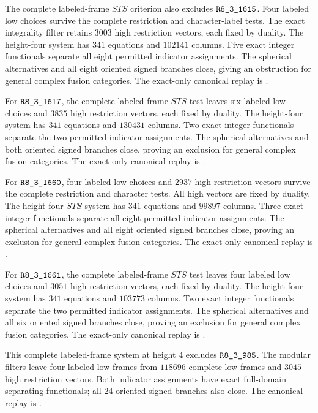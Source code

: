 The complete labeled-frame $STS$ criterion also excludes $\sha{R8_3_1615}$.
Four labeled low choices survive the complete restriction and
character-label tests. The exact integrality filter retains $3003$
high restriction vectors, each fixed by duality. The height-four
system has $341$ equations and $102141$ columns.
Five exact integer functionals separate all eight permitted indicator
assignments. The spherical alternatives and all eight oriented signed
branches close, giving an obstruction for general complex fusion
categories. The exact-only canonical replay is
.

For $\sha{R8_3_1617}$, the complete labeled-frame $STS$ test leaves six
labeled low choices and $3835$ high restriction vectors, each fixed by
duality. The height-four system has $341$ equations and $130431$ columns.
Two exact integer functionals separate the two permitted indicator
assignments. The spherical alternatives and both oriented signed
branches close, proving an exclusion for general complex fusion
categories. The exact-only canonical replay is
.

For $\sha{R8_3_1660}$, four labeled low choices and $2937$ high restriction
vectors survive the complete restriction and character tests. All high
vectors are fixed by duality. The height-four $STS$ system has $341$
equations and $99897$ columns. Three exact integer functionals separate
all eight permitted indicator assignments. The spherical alternatives
and all eight oriented signed branches close, proving an exclusion for
general complex fusion categories. The exact-only canonical replay is
.

For $\sha{R8_3_1661}$, the complete labeled-frame $STS$ test leaves four
labeled low choices and $3051$ high restriction vectors, each fixed by
duality. The height-four system has $341$ equations and $103773$ columns.
Two exact integer functionals separate the two permitted indicator
assignments. The spherical alternatives and all six oriented signed
branches close, proving an exclusion for general complex fusion
categories. The exact-only canonical replay is
.

This complete labeled-frame system at height $4$ excludes
$\sha{R8_3_985}$. The modular filters leave four labeled low frames from
$118696$ complete low frames and $3045$ high restriction vectors.
Both indicator assignments have exact full-domain separating
functionals; all $24$ oriented signed branches also close.
The canonical replay is
.

